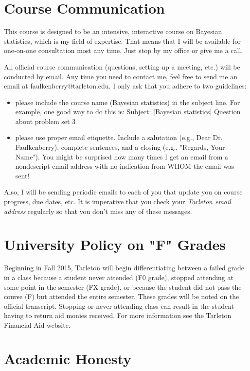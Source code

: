 \documentclass[10pt]{article}
\begin{document}
\section*{Course Communication}
\label{sec:orga0ba0e5}

This course is designed to be an intensive, interactive course on Bayesian statistics, which is my field of expertise.  That means that I will be available for one-on-one consultation most any time.  Just stop by my office or give me a call.

All official course communication (questions, setting up a meeting, etc.) will be conducted by email.  Any time you need to contact me, feel free to send me an email at faulkenberry@tarleton.edu.  I only ask that you adhere to two guidelines:
\begin{itemize}
\item please include the course name (Bayesian statistics) in the subject line.  For example, one good way to do this is:  Subject: [Bayesian statistics] Question about problem set 3
\item please use proper email etiquette.  Include a salutation (e.g., Dear Dr. Faulkenberry), complete sentences, and a closing (e.g., "Regards, Your Name").  You might be surprised how many times I get an email from a nondescript email address with no indication from WHOM the email was sent!
\end{itemize}

Also, I will be sending periodic emails to each of you that update you on course progress, due dates, etc.  It is imperative that you check your \emph{Tarleton email address} regularly so that you don't miss any of these messages.

\section*{University Policy on "F" Grades}
\label{sec:org3c05a87}
Beginning in Fall 2015, Tarleton will begin differentiating between a failed grade in a class because a student never attended (F0 grade), stopped attending at some point in the semester (FX grade), or because the student did not pass the course (F) but attended the entire semester. These grades will be noted on the official transcript. Stopping or never attending class can result in the student having to return aid monies received.  For more information see the Tarleton Financial Aid website.

\section*{Academic Honesty}
\label{sec:org596226c}
\end{document}

